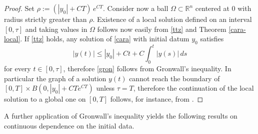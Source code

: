 \documentclass[A4paper,11pt]{article}
\theoremstyle{definition}
\begin{document}
\begin{proof}
Set $\rho:= (|y_0|+CT) \,e^{CT}$. Consider now a ball $\Omega \subset \mathbb R^n$ centered at $0$ with radius strictly greater than $\rho$. Existence of a local solution defined on an interval $[0,\tau]$ and taking values in $\Omega$ follows now easily from \eqref{ttz} and Theorem \ref{cara-local}. If \eqref{ttz} holds, any solution of \eqref{cara} with initial datum $y_0$ satisfies
$$
|y(t)|\le |y_0|+ Ct+C\int_0^t |y(s)|\,ds
$$
for every $t \in [0,\tau]$, therefore \eqref{gron} follows from Gronwall's inequality. In particular the graph of a solution $y(t)$ cannot reach the boundary of $[0,T]\times B(0,|y_0|+CTe^{CT})$ unless $\tau=T$, therefore the continuation of the local solution to a global one on $[0,T]$ follows, for instance, from \cite[Chapter 1, Theorem 4]{Fil}.
\end{proof}

A further application of Gronwall's inequality yields the following results on continuous dependence on the initial data.
\end{document}
